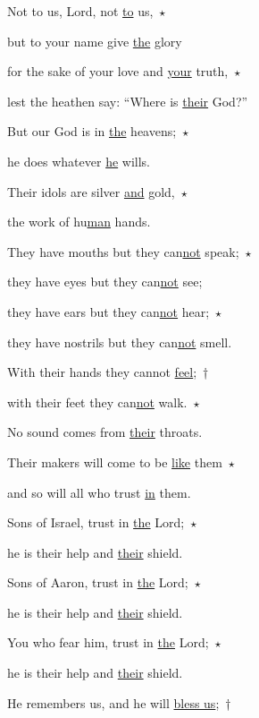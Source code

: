 \noindent Not to us, Lord, not \uline{to} us,~$\star$~\nopagebreak

but to your name give \uline{the} glory

\noindent for the sake of your love and \uline{your} truth,~$\star$~\nopagebreak

lest the heathen say: “Where is \uline{their} God?”



\noindent But our God is in \uline{the} heavens;~$\star$~\nopagebreak

he does whatever \uline{he} wills.

\noindent Their idols are silver \uline{and} gold,~$\star$~\nopagebreak

the work of hu\uline{man} hands.



\noindent They have mouths but they can\uline{not} speak;~$\star$~\nopagebreak

they have eyes but they can\uline{not} see;

\noindent they have ears but they can\uline{not} hear;~$\star$~\nopagebreak

they have nostrils but they can\uline{not} smell.



\noindent With their hands they cannot \uline{feel};~†~\nopagebreak

with their feet they can\uline{not} walk.~$\star$~\nopagebreak

No sound comes from \uline{their} throats.



\noindent Their makers will come to be \uline{like} them~$\star$~\nopagebreak

and so will all who trust \uline{in} them.



\noindent Sons of Israel, trust in \uline{the} Lord;~$\star$~\nopagebreak

he is their help and \uline{their} shield.

\noindent Sons of Aaron, trust in \uline{the} Lord;~$\star$~\nopagebreak

he is their help and \uline{their} shield.



\noindent You who fear him, trust in \uline{the} Lord;~$\star$~\nopagebreak

he is their help and \uline{their} shield.

\noindent He remembers us, and he will \uline{bless us};~†~\nopagebreak

